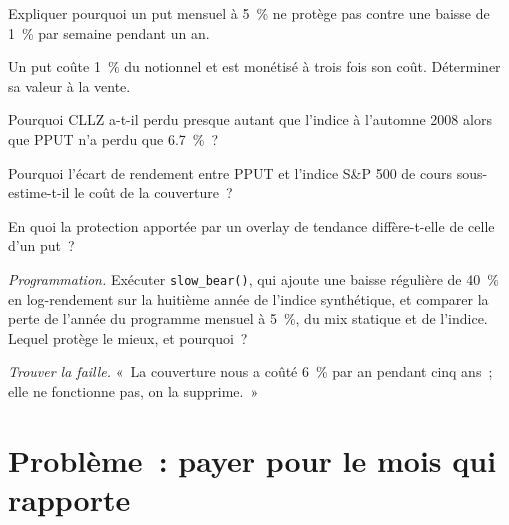 \begin{exercise}[$\star$]\label{exo:s2:tail-hedging-and-long-volatility:2}
Expliquer pourquoi un put mensuel à 5~\% ne protège pas contre une baisse de 1~\% par semaine pendant un an.
\end{exercise}

\begin{exercise}[$\star$]\label{exo:s2:tail-hedging-and-long-volatility:3}
Un put coûte 1~\% du notionnel et est monétisé à trois fois son coût. Déterminer sa valeur à la vente.
\end{exercise}

\begin{exercise}[$\star\star$]\label{exo:s2:tail-hedging-and-long-volatility:4}
Pourquoi CLLZ a-t-il perdu presque autant que l'indice à l'automne 2008 alors que PPUT n'a perdu que 6.7~\%~?
\end{exercise}

\begin{exercise}[$\star\star$]\label{exo:s2:tail-hedging-and-long-volatility:5}
Pourquoi l'écart de rendement entre PPUT et l'indice S\&P 500 de cours sous-estime-t-il le coût de la couverture~?
\end{exercise}

\begin{exercise}[$\star\star$]\label{exo:s2:tail-hedging-and-long-volatility:6}
En quoi la protection apportée par un overlay de tendance diffère-t-elle de celle d'un put~?
\end{exercise}

\begin{exercise}[$\star\star\star$]\label{exo:s2:tail-hedging-and-long-volatility:7}
\emph{Programmation.} Exécuter \texttt{slow\_bear()}, qui ajoute une baisse régulière de 40~\% en log-rendement sur la huitième année de l'indice synthétique, et comparer
la perte de l'année du programme mensuel à 5~\%, du mix statique et de l'indice. Lequel protège le mieux, et pourquoi~?
\end{exercise}

\begin{exercise}[$\star\star\star$]\label{exo:s2:tail-hedging-and-long-volatility:8}
\emph{Trouver la faille.} «~La couverture nous a coûté 6~\% par an pendant cinq ans~; elle ne fonctionne pas, on la supprime.~»
\end{exercise}

\section{Problème~: payer pour le mois qui rapporte}

